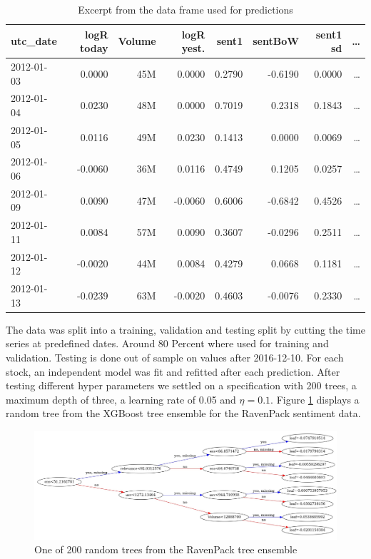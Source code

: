\begin{table}[h]
\centering
\small
\begin{tabular}{lrrrrrrr}
\toprule
utc\_date &  logR today &  Volume &  logR yest. &  sent1 &  sentBoW &  sent1 sd &  \dots \\
\midrule
2012-01-03 &       0.0000 &  45M &           0.0000 &      0.2790 &       -0.6190 &    0.0000 &         \dots \\
2012-01-04 &       0.0230 &  48M &              0.0000 &      0.7019 &        0.2318 &    0.1843 &      \dots \\
2012-01-05 &       0.0116 &  49M &              0.0230 &      0.1413 &        0.0000 &    0.0069 &      \dots \\
2012-01-06 &      -0.0060 &  36M &              0.0116 &      0.4749 &        0.1205 &    0.0257 &      \dots\\
2012-01-09 &       0.0090 &  47M &             -0.0060 &      0.6006 &       -0.6842 &    0.4526 &      \dots \\
2012-01-11 &       0.0084 &  57M &              0.0090 &      0.3607 &       -0.0296 &    0.2511 &      \dots \\
2012-01-12 &      -0.0020 &  44M &              0.0084 &      0.4279 &        0.0668 &    0.1181 &      \dots \\
2012-01-13 &      -0.0239 &  63M &             -0.0020 &      0.4603 &       -0.0076 &    0.2330 &      \dots \\
\bottomrule
\end{tabular}
    \caption{Excerpt from the data frame used for predictions}
    \label{tab:predictionFrame}
\end{table} 
The data was split into a training, validation and testing split by cutting the time series at predefined dates. Around 80 Percent where used for training and validation. Testing is done out of sample on values after 2016-12-10. For each stock, an independent model was fit and refitted after each prediction. After testing different hyper parameters we settled on a specification with 200 trees, a maximum depth of three, a learning rate of 0.05 and $\eta = 0.1$. Figure \ref{fig:tree} displays a random tree from the XGBoost tree ensemble for the RavenPack sentiment data. \\ 
\begin{figure}[h]
\centering
\includegraphics[width=\textwidth]{figures/treemodel2.jpg}
\caption{One of 200 random trees from the RavenPack tree ensemble}
\label{fig:tree}
\end{figure}

